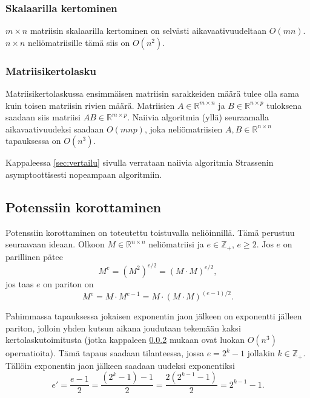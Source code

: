 \documentclass[10pt,a4paper,titlepage]{article}
\newcommand{\Z}{\ensuremath{\mathbb{Z}}}
\newcommand{\R}{\ensuremath{\mathbb{R}}}
\newcommand{\pseudo}[1]{{\small}}
\begin{document}
\subsubsection{Skalaarilla kertominen}

\pseudo{scale}

$m\times n$ matriisin skalaarilla kertominen on selvästi aikavaativuudeltaan $O(mn)$. $n\times n$ neliömatriisille
tämä siis on $O\left(n^2\right)$.

\subsubsection{Matriisikertolasku}
\label{sec:mul}

\pseudo{mul}

Matriisikertolaskussa ensimmäisen matriisin sarakkeiden määrä tulee olla sama kuin toisen matriisin rivien määrä.
Matriisien $A\in \R^{m\times n}$ ja $B\in \R^{n\times p}$ tuloksena saadaan siis matriisi $AB\in \R^{m\times p}$.
Naiivia algoritmia (yllä) seuraamalla aikavaativuudeksi saadaan $O(mnp)$, joka neliömatriisien $A,B\in \R^{n\times n}$
tapauksessa on $O\left(n^3\right)$.

Kappaleessa \ref{sec:vertailu} sivulla \pageref{sec:vertailu} verrataan naiivia algoritmia Strassenin asymptoottisesti
nopeampaan algoritmiin.

\subsection{Potenssiin korottaminen}

\pseudo{pow}

Potenssiin korottaminen on toteutettu toistuvalla neliöinnillä. Tämä perustuu seuraavaan ideaan.
Olkoon $M\in \R^{n\times n}$ neliömatriisi ja $e\in\Z_+$, $e\geq2$. Jos $e$ on parillinen pätee
$$
M^e = \left( M^2 \right)^{e/2} = \left( M \cdot M \right)^{e/2},
$$
jos taas $e$ on pariton on
$$
M^e = M \cdot M^{e-1} = M \cdot \left( M \cdot M \right)^{(e-1)/2}.
$$

Pahimmassa tapauksessa jokaisen exponentin jaon jälkeen on exponentti jälleen pariton, jolloin yhden kutsun aikana joudutaan tekemään
kaksi kertolaskutoimitusta (jotka kappaleen \ref{sec:mul} mukaan ovat luokan $O(n^3)$ operaatioita). Tämä tapaus saadaan tilanteessa, 
jossa $e = 2^k - 1$ jollakin $k\in\Z_+$. Tällöin exponentin jaon jälkeen saadaan uudeksi exponentiksi
$$
e' = \frac{e - 1}{2} = \frac{\left( 2^k - 1 \right) - 1}{2} = \frac{2\left( 2^{k-1} - 1 \right)}{2} = 2^{k-1} - 1.
$$
\end{document}
